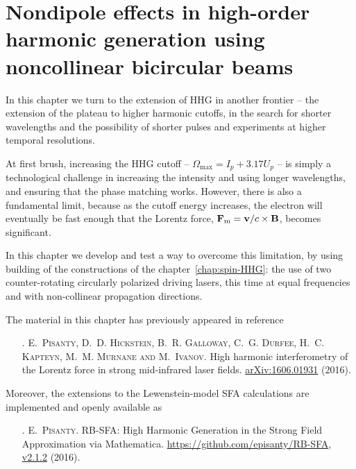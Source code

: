 

\chapter[Nondipole effects in HHG using noncollinear bicircular beams]{Nondipole effects in high-order harmonic generation using noncollinear bicircular beams}
\label{chap:nondipole-HHG}
In this chapter we turn to the extension of HHG in another frontier -- the extension of the plateau to higher harmonic cutoffs, in the search for shorter wavelengths and the possibility of shorter pulses and experiments at higher temporal resolutions. 

At first brush, increasing the HHG cutoff -- $\Omega_\mathrm{max}=I_p + 3.17U_p$ -- is simply a technological challenge in increasing the intensity and using longer wavelengths, and ensuring that the phase matching works. However, there is also a fundamental limit, because as the cutoff energy increases, the electron will eventually be fast enough that the Lorentz force, $\vb{F}_\mathrm{m}=\vb{v}/c\times\vb{B}$, becomes significant.

In this chapter we develop and test a way to overcome this limitation, by using building of the constructions of the chapter~\ref{chap:spin-HHG}: the use of two counter-rotating circularly polarized driving lasers, this time at equal frequencies and with non-collinear propagation directions.




The material in this chapter has previously appeared in reference

\begin{enumerate}
\item[{\hypersetup{citecolor=black}\citealp{Pisanty_lorentz_2016}}.]
\textsc{E.~Pisanty, D.~D. Hickstein, B.~R. Galloway, C.~G. Durfee, H.~C. Kap\-teyn, M.~M. Murnane and M.~Ivanov}.
\newblock High harmonic interferometry of the Lorentz force in strong
  mid-infrared laser fields. \href{http://arxiv.org/abs/1606.01931}{arXiv:1606.01931} (2016).
\end{enumerate}


\noindent
Moreover, the extensions to the Lewenstein-model SFA calculations are implemented and openly available as

\begin{enumerate}
\item[{\hypersetup{citecolor=black}\citealp{RB-SFA}}.]
\textsc{E.~Pisanty}. RB-SFA: High Harmonic Generation in the Strong Field Approximation via Mathematica. \url{https://github.com/episanty/RB-SFA}, \href{http://dx.doi.org/10.5281/zenodo.164626}{v2.1.2} (2016).
\end{enumerate}





